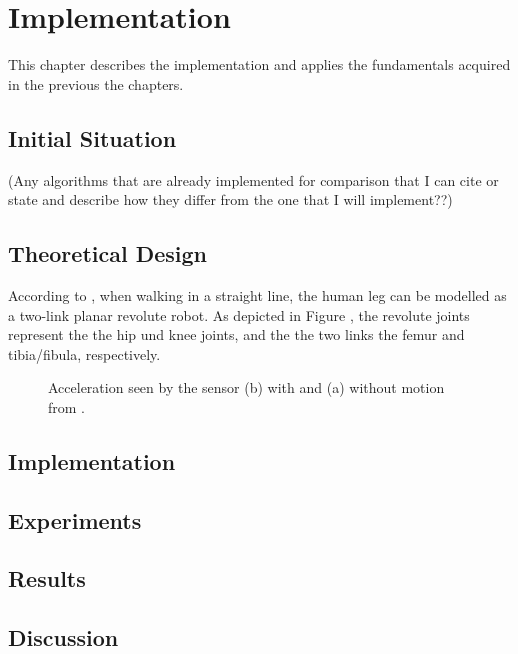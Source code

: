\chapter{Implementation}
\label{ch:Implementation}

This chapter describes the implementation and applies the fundamentals acquired in the previous the chapters.

\section{Initial Situation}

 (Any algorithms that are already implemented for comparison that I can cite or state and describe how they differ from the one that I will implement??)

\section{Theoretical Design}

According to \citeauthor{bennett_motion_2014} \cite{bennett_motion_2014}, when walking in a straight line, the human leg can be modelled as a two-link planar revolute robot. As depicted in Figure , the revolute joints represent the the hip und knee joints, and the the two links the femur and tibia/fibula, respectively.

\begin{figure}
\centering
{}

\caption{Acceleration seen by the sensor (b) with and (a) without motion from \cite{bennett_motion_2014}.} \label{fig:acceleration_motion}
\end{figure} 


\section{Implementation}

\section{Experiments}

\section{Results}

\section{Discussion}

